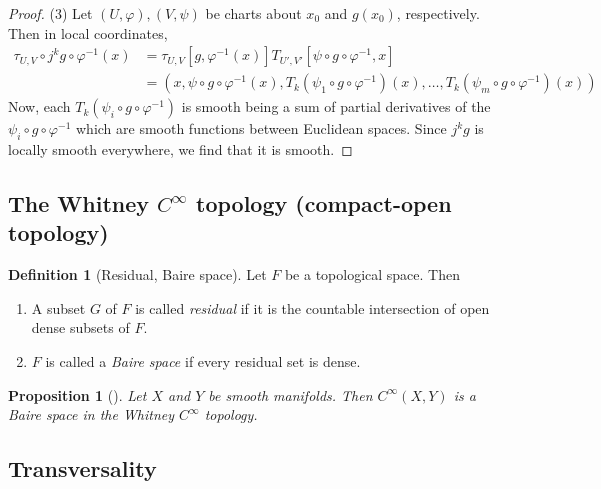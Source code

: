 \documentclass[reqno]{amsart}
\newtheorem{proposition}[theorem]{Proposition}
\theoremstyle{definition}
\newtheorem{definition}[theorem]{Definition}
\theoremstyle{remark}
\begin{document}
\begin{proof}
    (3) Let $\left( U, \varphi  \right) ,
    \left( V, \psi  \right) $ be charts about
    $x_0$ and $g(x_0)$, respectively.
    Then
    in local coordinates,
    \begin{align*}
    \tau_{U,V} \circ j^{k}g \circ \varphi^{-1}(x)
    &= \tau_{U,V} \left[ g, \varphi^{-1}(x) \right]
    T_{U',V'} \left[ \psi \circ g \circ \varphi^{-1}, x \right] \\
    &=
    \left( x, \psi \circ g \circ \varphi^{-1}(x),
    T_k\left( \psi_1 \circ g \circ \varphi^{-1} \right) (x),
\ldots, T_k \left( \psi_m \circ g \circ \varphi^{-1} \right) (x)
\right)
    \end{align*}
    Now, each
    $T_k \left( \psi_i \circ g \circ \varphi^{-1} \right) $
    is smooth being a sum of partial derivatives of the
    $\psi_i \circ g \circ \varphi^{-1}$
    which are smooth functions between Euclidean spaces.
    Since $j^{k}g$ is locally smooth everywhere, we find
    that it is smooth.
\end{proof}





\subsection{The Whitney $C^{\infty}$ topology (compact-open topology)}

\begin{definition}[Residual, Baire space]
    Let $F$ be a topological space.
    Then
    \begin{enumerate}
        \item A subset $G$ of $F$ is called
            \textit{residual} if it is the countable
            intersection of open dense subsets of $F$.
        \item $F$ is called a \textit{Baire space} if
            every residual set is dense.
    \end{enumerate}
\end{definition}

\begin{proposition}[]\label{Sm-Maps-Mfds-Baire}
    Let $X$ and $Y$ be smooth manifolds. Then
    $C^{\infty}(X,Y)$ is a Baire space in the
    Whitney $C^{\infty}$ topology.
\end{proposition}

\subsection{Transversality}
\end{document}
